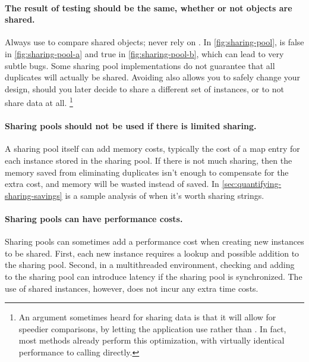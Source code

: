 \paragraph{The result of  testing should be the same,
whether or not objects are shared.}
Always use  to compare shared objects; never rely on \code{==}.
In \autoref{fig:sharing-pool},
 is false in \ref{fig:sharing-pool-a} and true in
\ref{fig:sharing-pool-b}, which can lead to very subtle bugs.
Some sharing pool implementations do not guarantee that all
duplicates will actually be shared. Avoiding \code{==} also allows
you to safely change your design, should you later decide to share a different set of instances, or to not share data at all.
\footnote{An argument sometimes heard for sharing data is that it will
allow for speedier comparisons, by letting the application use \code{==} rather
than . In fact, most
  methods already perform this optimization, with virtually
 identical performance to calling \code{==}
 directly.}
 
\paragraph{Sharing pools should not be used if there is limited sharing.}
A sharing pool itself can add
memory costs, typically the cost of a map entry for each instance stored in the
sharing pool.
If there is not much sharing, then the memory saved from
eliminating duplicates isn't enough to compensate for the
extra cost, and memory will be wasted instead of saved.  In \autoref{sec:quantifying-sharing-savings} is
a sample analysis of when it's worth sharing strings.


\paragraph{Sharing pools can have performance costs.}
Sharing pools can sometimes add a performance cost when creating new instances
to be shared.  First, each new instance requires a lookup and possible
addition to the sharing pool. Second, in a multithreaded
environment, checking and adding to the sharing pool can introduce latency if the sharing pool is synchronized.
The use of shared instances, however, does not incur any extra
time costs.

